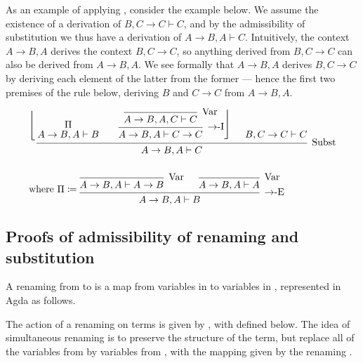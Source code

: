 As an example of applying , consider the example below.
We assume the existence of a derivation of
$B, C \to C \vdash C$, and by the admissibility of substitution we thus have a
derivation of $A \to B, A \vdash C$.
Intuitively, the context $A \to B, A$ derives the context $B, C \to C$, so
anything derived from $B, C \to C$ can also be derived from $A \to B, A$.
We see formally that $A \to B, A$ derives $B, C \to C$ by deriving each element
of the latter from the former --- hence the first two premises of the 
rule below, deriving $B$ and $C \to C$ from $A \to B, A$.

\begin{align*}
  &\begin{prooftree}
    \infer0{F}
    \infer1{F}
    \rewrite{}
    \hypo{\Pi}
    \infer[no rule]1{A \to B, A \vdash B}
    \overlay
    \delims{\left\lfloor}{\right.}
    \infer0[Var]{A \to B, A, C \vdash C}
    \infer1[$\to$-I]{A \to B, A \vdash C \to C}
    \delims{\left.}{\right\rfloor}
    \hypo{B, C \to C \vdash C}
    \infer3[Subst]{A \to B, A \vdash C}
  \end{prooftree}
  \\\\
  &\textrm{where }\Pi \coloneqq
  \begin{prooftree}
    \infer0[Var]{A \to B, A \vdash A \to B}
    \infer0[Var]{A \to B, A \vdash A}
    \infer2[$\to$-E]{A \to B, A \vdash B}
  \end{prooftree}
\end{align*}

\subsection{Proofs of admissibility of renaming and substitution}

A renaming from \AgdaBound{$\Gamma$} to \AgdaBound{$\Delta$}
is a map from variables in \AgdaBound{$\Delta$} to variables in
\AgdaBound{$\Gamma$}, represented in Agda as follows.

\Ren{}

The action of a renaming \AgdaBound{$\rho$} on terms is given by
\AgdaSpace{}\AgdaBound{$\rho$}, with 
defined below.
The idea of simultaneous renaming is to preserve the structure of the term, but
replace all of the variables from \AgdaBound{$\Delta$} by variables from
\AgdaBound{$\Gamma$}, with the mapping given by the renaming \AgdaBound{$\rho$}.

